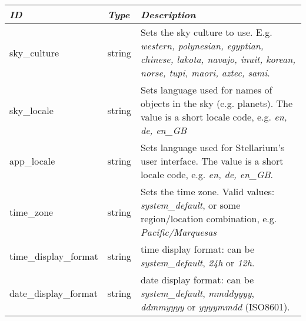 \subsection{}\label{sec:config.ini:localization}

\begin{longtabu} to \textwidth {l|l|X}\toprule
\emph{ID} & \emph{Type} & \emph{Description}\\\midrule
sky\_culture & string & Sets the sky culture to use. E.g. \emph{western, polynesian, egyptian, chinese, 
                        lakota, navajo, inuit, korean, norse, tupi, maori, aztec, sami}.\\\midrule
sky\_locale & string & Sets language used for names of objects in the sky (e.g. planets). 
                       The value is a short locale code, e.g. \emph{en, de, en\_GB}\\\midrule
app\_locale & string & Sets language used for Stellarium's user interface. 
                       The value is a short locale code, e.g. \emph{en, de, en\_GB}.\\\midrule
time\_zone & string  & Sets the time zone. Valid values: \emph{system\_default}, 
                       or some region/location combination, e.g. \emph{Pacific/Marquesas}\\\midrule
time\_display\_format & string & time display format: can be \emph{system\_default}, \emph{24h} or \emph{12h}.\\\midrule
date\_display\_format & string & date display format: can be \emph{system\_default}, \emph{mmddyyyy}, \emph{ddmmyyyy} or \emph{yyyymmdd} (ISO8601).\\\bottomrule
\end{longtabu}

\subsection{}\label{sec:config.ini:main}

